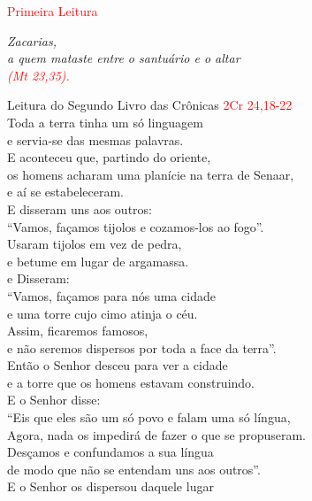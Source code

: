 \documentclass{book}
\begin{document}
\pagestyle{empty}
\begin{center}
    \textcolor{red}{Primeira Leitura}
\end{center}
\begin{flushright}
    \textit{Zacarias, \\ a quem mataste entre o santuário e o altar \\ \textcolor{red}{(Mt 23,35).}}
\end{flushright}
\begin{flushleft}
    \vspace{.2cm}
    Leitura do Segundo Livro das Crônicas
    \hspace{\fill}
    \textcolor{red}{2Cr 24,18-22}
    \vspace{.2cm} \\
    Toda a terra tinha um só linguagem \\
    e servia-se das mesmas palavras. \\
    E aconteceu que, partindo do oriente, \\
    os homens acharam uma planície na terra de Senaar, \\
    e aí se estabeleceram. \\
    E disseram uns aos outros: \\
    ``Vamos, façamos tijolos e cozamos-los ao fogo''. \\
    Usaram tijolos em vez de pedra, \\
    e betume em lugar de argamassa. \\
    e Disseram: \\
    ``Vamos, façamos para nós uma cidade \\
    e uma torre cujo cimo atinja o céu. \\
    Assim, ficaremos famosos, \\
    e não seremos dispersos por toda a face da terra''. \\
    Então o Senhor desceu para ver a cidade \\
    e a torre que os homens estavam construindo. \\
    E o Senhor disse: \\
    ``Eis que eles são um só povo e falam uma só língua, \\
    Agora, nada os impedirá de fazer o que se propuseram. \\
    Desçamos e confundamos a sua língua \\
    de modo que não se entendam uns aos outros''. \\
    E o Senhor os dispersou daquele lugar \\

\end{flushleft}
\end{document}
